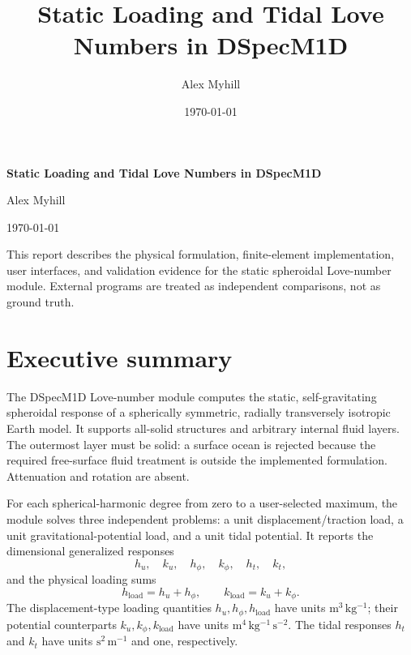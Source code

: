 \documentclass[11pt,a4paper]{article}
\title{\textbf{Static Loading and Tidal Love Numbers in DSpecM1D}}
\author{Alex Myhill}
\date{\today}
\begin{document}
\hypersetup{pageanchor=false}

\begin{titlepage}
  \centering
  \vspace*{0.20\textheight}
  {\LARGE\bfseries Static Loading and Tidal Love Numbers in
  DSpecM1D\par}
  \vspace{2.0cm}
  {\Large Alex Myhill\par}
  \vspace{0.6cm}
  {\large \today\par}
  \vfill
  \begin{minipage}{0.78\textwidth}
  \small
  This report describes the physical formulation, finite-element
  implementation, user interfaces, and validation evidence for the static
  spheroidal Love-number module.  External programs are treated as independent
  comparisons, not as ground truth.
  \end{minipage}
  \vspace*{0.10\textheight}
\end{titlepage}

\hypersetup{pageanchor=true}
\tableofcontents
\clearpage
{}

\section{Executive summary}

The DSpecM1D Love-number module computes the static, self-gravitating
spheroidal response of a spherically symmetric, radially transversely
isotropic Earth model.  It supports all-solid structures and arbitrary
internal fluid layers.  The outermost layer must be solid: a surface ocean is
rejected because the required free-surface fluid treatment is outside the
implemented formulation.  Attenuation and rotation are absent.

For each spherical-harmonic degree from zero to a user-selected maximum, the
module solves three independent problems: a unit displacement/traction load,
a unit gravitational-potential load, and a unit tidal potential.  It reports
the dimensional generalized responses
\[
  h_u,\quad k_u,\quad h_\phi,\quad k_\phi,\quad h_t,\quad k_t,
\]
and the physical loading sums
\[
  h_{\mathrm{load}}=h_u+h_\phi,\qquad
  k_{\mathrm{load}}=k_u+k_\phi.
\]
The displacement-type loading quantities \(h_u,h_\phi,h_{\mathrm{load}}\)
have units \(\mathrm{m^3\,kg^{-1}}\); their potential counterparts
\(k_u,k_\phi,k_{\mathrm{load}}\) have units
\(\mathrm{m^4\,kg^{-1}\,s^{-2}}\).  The tidal responses \(h_t\) and \(k_t\)
have units \(\mathrm{s^2\,m^{-1}}\) and one, respectively.
\end{document}
